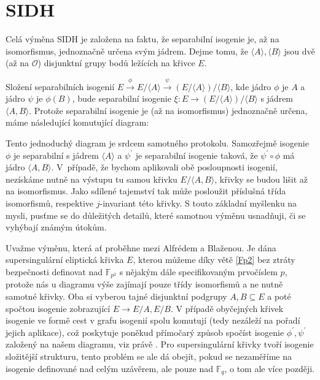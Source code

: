 \documentclass[12pt]{report}
\begin{document}
\section{SIDH}

Celá výměna SIDH je založena na faktu, že separabilní isogenie je, až na isomorfismus, jednoznačně určena svým jádrem. Dejme tomu, že $\langle A \rangle, \langle B \rangle$ jsou dvě (až na $\mathcal{O}$) disjunktní grupy bodů ležících na křivce $E$.

Složení separabilních isogenií $E \stackrel{\phi}{\longrightarrow} E/\langle A \rangle \stackrel{\psi}{\longrightarrow} (E / \langle A \rangle)/\langle B \rangle$, kde jádro $\phi$ je $A$ a jádro $\psi$ je $\phi (B)$, bude separabilní isogenie $\xi : E \longrightarrow (E / \langle A \rangle)/\langle B \rangle$ s jádrem $\langle A,B \rangle$. Protože separabilní isogenie je (až na isomorfismus) jednoznačně určena, máme následující komutující diagram:

\begin{figure}[h]
\begin{center} 
\end{center}
\end{figure}

Tento jednoduchý diagram je srdcem samotného protokolu. Samozřejmě isogenie $\phi$ je separabilní s jádrem $\langle A \rangle$ a $\psi^\prime$ je separabilní isogenie taková, že $\psi^\prime \circ \phi$ má jádro $\langle A,B \rangle$. V~případě, že bychom aplikovali obě posloupnosti isogenií, nezískáme nutně na výstupu tu samou křivku $E/\langle A,B \rangle$, křivky se budou lišit až na isomorfismus. Jako sdílené tajemství tak může posloužit příslušná třída isomorfismů, respektive $j$-invariant této křivky. S touto základní myšlenku na mysli, pusťme se do důležitých detailů, které samotnou výměnu usnadňuji, či se vyhýbají známým útokům.

Uvažme výměnu, která ať proběhne mezi Alfrédem a Blaženou. Je dána supersingulární eliptická křivka $E$, kterou můžeme díky větě \ref{Fp2} bez ztráty bezpečnosti definovat nad $\mathbb{F}_{p^2}$ s nějakým dále specifikovaným prvočíslem $p$, protože nás u diagramu výše zajímají pouze třídy isomorfismů a ne nutně samotné křivky. Oba si vyberou tajné disjunktní podgrupy $A,B \subseteq E$ a poté spočtou isogenie zobrazující $E \longrightarrow E/A,E/B$. V případě obyčejných křivek isogenie ve formě cest v grafu isogenií spolu komutují (tedy nezáleží na pořadí jejich aplikace), což poskytuje poněkud přímočarý způsob spočíst isogenie $\phi^\prime,\psi^\prime$ založený na našem diagramu, viz právě \cite{Stolbunov}. Pro supersingulární křivky tvoří isogenie složitější strukturu, tento problém se ale dá obejít, pokud se nezaměříme na isogenie definované nad celým uzávěrem, ale pouze nad $\mathbb{F}_q$, o tom ale více později. 
\end{document}
